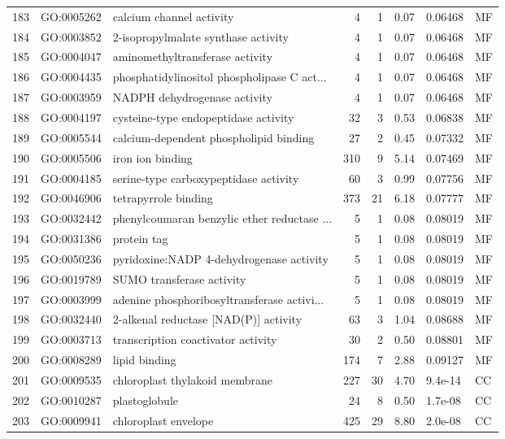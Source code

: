 \documentclass[12pt,oneside,a4paper]{article}
\begin{document}
\begin{longtable}{rllrrrll}
  183 & GO:0005262 & calcium channel activity &   4 &   1 & 0.07 & 0.06468 & MF \\ 
  184 & GO:0003852 & 2-isopropylmalate synthase activity &   4 &   1 & 0.07 & 0.06468 & MF \\ 
  185 & GO:0004047 & aminomethyltransferase activity &   4 &   1 & 0.07 & 0.06468 & MF \\ 
  186 & GO:0004435 & phosphatidylinositol phospholipase C act... &   4 &   1 & 0.07 & 0.06468 & MF \\ 
  187 & GO:0003959 & NADPH dehydrogenase activity &   4 &   1 & 0.07 & 0.06468 & MF \\ 
  188 & GO:0004197 & cysteine-type endopeptidase activity &  32 &   3 & 0.53 & 0.06838 & MF \\ 
  189 & GO:0005544 & calcium-dependent phospholipid binding &  27 &   2 & 0.45 & 0.07332 & MF \\ 
  190 & GO:0005506 & iron ion binding & 310 &   9 & 5.14 & 0.07469 & MF \\ 
  191 & GO:0004185 & serine-type carboxypeptidase activity &  60 &   3 & 0.99 & 0.07756 & MF \\ 
  192 & GO:0046906 & tetrapyrrole binding & 373 &  21 & 6.18 & 0.07777 & MF \\ 
  193 & GO:0032442 & phenylcoumaran benzylic ether reductase ... &   5 &   1 & 0.08 & 0.08019 & MF \\ 
  194 & GO:0031386 & protein tag &   5 &   1 & 0.08 & 0.08019 & MF \\ 
  195 & GO:0050236 & pyridoxine:NADP 4-dehydrogenase activity &   5 &   1 & 0.08 & 0.08019 & MF \\ 
  196 & GO:0019789 & SUMO transferase activity &   5 &   1 & 0.08 & 0.08019 & MF \\ 
  197 & GO:0003999 & adenine phosphoribosyltransferase activi... &   5 &   1 & 0.08 & 0.08019 & MF \\ 
  198 & GO:0032440 & 2-alkenal reductase [NAD(P)] activity &  63 &   3 & 1.04 & 0.08688 & MF \\ 
  199 & GO:0003713 & transcription coactivator activity &  30 &   2 & 0.50 & 0.08801 & MF \\ 
  200 & GO:0008289 & lipid binding & 174 &   7 & 2.88 & 0.09127 & MF \\ 
  201 & GO:0009535 & chloroplast thylakoid membrane & 227 &  30 & 4.70 & 9.4e-14 & CC \\ 
  202 & GO:0010287 & plastoglobule &  24 &   8 & 0.50 & 1.7e-08 & CC \\ 
  203 & GO:0009941 & chloroplast envelope & 425 &  29 & 8.80 & 2.0e-08 & CC \\ 

\end{longtable}
\end{document}
